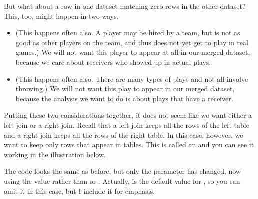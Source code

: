 \documentclass[letterpaper,10pt,english]{jupyterBook}
\begin{document}
\sphinxAtStartPar
But what about a row in one dataset matching zero rows in the other dataset?  This, too, might happen in two ways.
\begin{itemize}
\item {} 
\sphinxAtStartPar
{}  (This happens often also.  A player may be hired by a team, but is not as good as other players on the team, and thus does not yet get to play in real games.)  We will not want this player to appear at all in our merged dataset, because we care about receivers who showed up in actual plays.

\item {} 
\sphinxAtStartPar
{}  (This happens often also.  There are many types of plays and not all involve throwing.)  We will not want this play to appear in our merged dataset, because the analysis we want to do is about plays that have a receiver.

\end{itemize}

\sphinxAtStartPar
Putting these two considerations together, it does not seem like we want either a left join or a right join.  Recall that a left join keeps all the rows of the left table and a right join keeps all the rows of the right table.  In this case, however, we want to keep only rows that appear in  tables.  This is called an  and you can see it working in the illustration below.

\sphinxAtStartPar
{}

\sphinxAtStartPar
The code looks the same as before, but only the  parameter has changed, now using the value  rather than  or .  Actually,  is the default value for , so you can omit it in this case, but I include it for emphasis.

\begin{sphinxVerbatim}[commandchars=\\\{\}]
    
       
\end{sphinxVerbatim}
\end{document}
